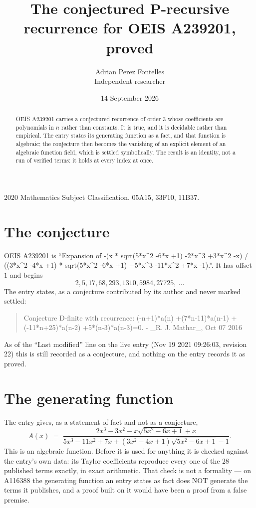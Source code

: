 \documentclass[11pt,a4paper]{article}
\title{The conjectured P-recursive recurrence for OEIS A239201, proved}
\author{Adrian Perez Fontelles\\ \small Independent researcher}
\date{14 September 2026}
\theoremstyle{plain}
\theoremstyle{definition}
\begin{document}
\maketitle

\begin{abstract}
OEIS A239201 carries a conjectured recurrence of order $3$ whose coefficients are polynomials in
$n$ rather than constants. It is true, and it is decidable rather than empirical. The entry
states its generating function as a fact, and that function is algebraic; the conjecture then
becomes the vanishing of an explicit element of an algebraic function field, which is settled
symbolically. The result is an identity, not a run of verified terms: it holds at every index
at once.
\end{abstract}

\noindent\small 2020 Mathematics Subject Classification. 05A15, 33F10, 11B37.\normalsize

\section{The conjecture}

OEIS A239201 is ``Expansion of -(x * sqrt(5*x\^{}2 -6*x +1) -2*x\^{}3 +3*x\^{}2 -x) / ((3*x\^{}2 -4*x +1) * sqrt(5*x\^{}2 -6*x +1) +5*x\^{}3 -11*x\^{}2 +7*x -1).''. It has offset $1$ and begins
\[
2, 5, 17, 68, 293, 1310, 5984, 27725,\ \dots
\]
The entry states, as a conjecture contributed by its author and never marked settled:
\begin{quote}\raggedright\small
Conjecture D-finite with recurrence: (-n+1)*a(n) +(7*n-11)*a(n-1) +(-11*n+25)*a(n-2) +5*(n-3)*a(n-3)=0. - \_R. J. Mathar\_, Oct 07 2016
\end{quote}
As of the ``Last modified'' line on the live entry (Nov 19 2021 09:26:03, revision 22)
this is still recorded as a conjecture, and nothing on the entry records it as proved.

\section{The generating function}

The entry gives, as a statement of fact and not as a conjecture,
\[
A(x)\;=\;\frac{2 x^{3} - 3 x^{2} - x \sqrt{5 x^{2} - 6 x + 1} + x}{5 x^{3} - 11 x^{2} + 7 x + \left(3 x^{2} - 4 x + 1\right) \sqrt{5 x^{2} - 6 x + 1} - 1} .
\]
This is an algebraic function. Before it is used for anything it is checked against the entry's
own data: its Taylor coefficients reproduce every one of the $28$ published terms
exactly, in exact arithmetic. That check is not a formality --- on A116388 the generating
function an entry states as fact does NOT generate the terms it publishes, and a proof built on
it would have been a proof from a false premise.
\end{document}
